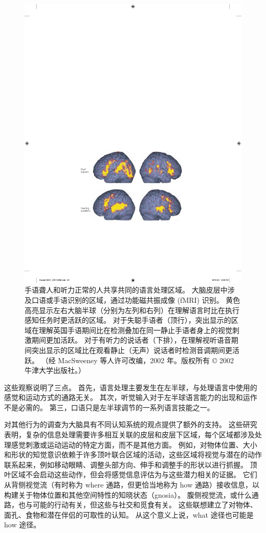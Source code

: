 \begin{figure}[htbp]
	\centering
	\includegraphics[width=0.5\linewidth]{chap01/fig_1_8}
	\caption{手语聋人和听力正常的人共享共同的语言处理区域。 大脑皮层中涉及口语或手语识别的区域，通过功能磁共振成像 (fMRI) 识别。 黄色高亮显示左右大脑半球（分别为左列和右列）在理解语言时比在执行感知任务时更活跃的区域。 对于失聪手语者（顶行），突出显示的区域在理解英国手语期间比在检测叠加在同一静止手语者身上的视觉刺激期间更加活跃。 对于有听力的说话者（下排），在理解视听语音期间突出显示的区域比在观看静止（无声）说话者时检测音调期间更活跃。 （经 MacSweeney 等人许可改编，2002 年。版权所有 © 2002 牛津大学出版社。）}
	\label{fig:1_8}
\end{figure}


这些观察说明了三点。 
首先，语言处理主要发生在左半球，与处理语言中使用的感觉和运动方式的通路无关。 
其次，听觉输入对于左半球语言能力的出现和运作不是必需的。 
第三，口语只是左半球调节的一系列语言技能之一。


对其他行为的调查为大脑具有不同认知系统的观点提供了额外的支持。 
这些研究表明，复杂的信息处理需要许多相互关联的皮层和皮层下区域，每个区域都涉及处理感觉刺激或运动运动的特定方面，而不是其他方面。 
例如，对物体位置、大小和形状的知觉意识依赖于许多顶叶联合区域的活动，这些区域将视觉与潜在的动作联系起来，例如移动眼睛、调整头部方向、伸手和调整手的形状以进行抓握。 
顶叶区域不会启动这些动作，但会将感觉信息评估为与这些潜力相关的证据。 
它们从背侧视觉流（有时称为 where 通路，但更恰当地称为 how 通路）接收信息，以构建关于物体位置和其他空间特性的知晓状态（gnosia）。 
腹侧视觉流，或什么通路，也与可能的行动有关，但这些与社交和觅食有关。 
这些联想建立了对物体、面孔、食物和潜在伴侣的可取性的认知。 
从这个意义上说，what 途径也可能是 how 途径。



